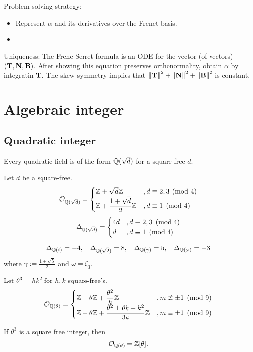 \documentclass[11pt]{article}
\let\realsection\section
\renewcommand\section{\newpage\realsection}
\begin{document}
Problem solving strategy: 
\begin{itemize}
\item Represent $\alpha$ and its derivatives over the Frenet basis.
\item 
\end{itemize}

Uniqueness: The Frene-Serret formula is an ODE for the vector (of vectors) $(\mathbf{T},\mathbf{N},\mathbf{B})$.
After showing this equation preserves orthonormality, obtain $\alpha$ by integratin $\mathbf{T}$.
The skew-symmetry implies that $\left\lVert\mathbf{T}\right\rVert^2+\left\lVert\mathbf{N}\right\rVert^2+\left\lVert\mathbf{B}\right\rVert^2$ is constant.








\section{Algebraic integer}
\subsection{Quadratic integer}
\begin{thm}
Every quadratic field is of the form $\mathbb{Q}(\sqrt d)$ for a square-free $d$.
\end{thm}
\begin{thm}
Let $d$ be a square-free.
\[\mathcal{O}_{\mathbb{Q}(\sqrt d)}=\begin{cases}\mathbb{Z}+\sqrt d\mathbb{Z}&,d\equiv2,3\pmod4\\\displaystyle\mathbb{Z}+\frac{1+\sqrt d}2\mathbb{Z}&,d\equiv1\pmod4\end{cases}\]
\[\Delta_{\mathbb{Q}(\sqrt d)}=\begin{cases}4d&,d\equiv2,3\pmod4\\ d&,d\equiv1\pmod4\end{cases}\]
\end{thm}
\begin{ex}
\[\Delta_{\mathbb{Q}(i)}=-4,\quad\Delta_{\mathbb{Q}(\sqrt2)}=8,\quad\Delta_{\mathbb{Q}(\gamma)}=5,\quad\Delta_{\mathbb{Q}(\omega)}=-3\]
where $\gamma:=\frac{1+\sqrt5}2$ and $\omega=\zeta_3$.
\end{ex}
\begin{thm}
Let $\theta^3=hk^2$ for $h,k$ square-free's.
\[\mathcal{O}_{\mathbb{Q}(\theta)}=\begin{cases}\displaystyle\mathbb{Z}+\theta\mathbb{Z}+\frac{\theta^2}k\mathbb{Z}&,m\not\equiv\pm1\pmod9\\
\displaystyle\mathbb{Z}+\theta\mathbb{Z}+\frac{\theta^2\pm\theta k+k^2}{3k}\mathbb{Z}&,m\equiv\pm1\pmod9\end{cases}\]
\end{thm}
\begin{cor}
If $\theta^3$ is a square free integer, then
\[\mathcal{O}_{\mathbb{Q}(\theta)}=\mathbb{Z}[\theta].\]
\end{cor}
\end{document}
